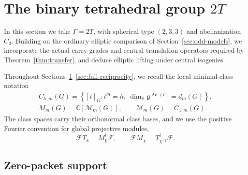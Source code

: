\documentclass[11pt,a4paper,reqno]{amsart}
\theoremstyle{plain}
\theoremstyle{definition}
\theoremstyle{remark}
\numberwithin{equation}{section}
\DeclareMathOperator{\Ad}{Ad}
\newcommand{\CC}{\mathbb C}
\newcommand{\RR}{\mathbb R}
\newcommand{\fg}{\mathfrak g}
\newcommand{\cM}{\mathcal M}
\begin{document}
\section{The binary tetrahedral group \texorpdfstring{$2T$}{2T}}\label{sec:tetrahedral}

In this section we take $\Gamma=2T$, with spherical type $(2,3,3)$ and abelianization $C_3$. Building on the ordinary elliptic comparison of Section~\ref{sec:odd-models}, we incorporate the actual carry grades and central translation operators required by Theorem~\ref{thm:transfer}, and deduce elliptic lifting under central isogenies.

Throughout Sections~\ref{sec:tetrahedral}--\ref{sec:full-reciprocity}, we recall the local minimal-class notation
\begin{equation}\label{eq:local-minimal-classes}
\begin{gathered}
C_{h,m}(G)=\left\{[t]_G:t^m=h,\ \dim_{\RR}\fg^{\Ad(t)}=d_m(G)\right\},\\
M_m(G)=\CC[\cM_m(G)],\qquad \cM_m(G)=C_{1,m}(G).
\end{gathered}
\end{equation}
The class spaces carry their orthonormal class bases, and we use the positive Fourier convention for global projective modules,
\begin{equation}\label{eq:global-fourier-convention}
\mathcal F T_k=M_k^\dagger\mathcal F,
\qquad
\mathcal F M_\chi=T_{\chi^{-1}}^\dagger\mathcal F.
\end{equation}

\subsection{Zero-packet support}
\end{document}
